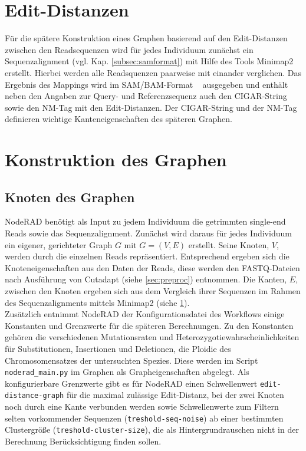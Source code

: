 \section{Edit-Distanzen} \label{sec:edit}

Für die spätere Konstruktion eines Graphen basierend auf den Edit-Distanzen zwischen den Readsequenzen wird für jedes Individuum zunächst ein Sequenzalignment (vgl. Kap. \ref {subsec:samformat}) mit Hilfe des Tools Minimap2 ~\cite{li_2018} erstellt. Hierbei werden alle Readsquenzen paarweise mit einander verglichen. Das Ergebnis des Mappings wird im SAM/BAM-Format ~\cite{li_2009} ausgegeben und enthält neben den Angaben zur Query- und Referenzsequenz auch den CIGAR-String sowie den NM-Tag mit den Edit-Distanzen. Der CIGAR-String und der NM-Tag definieren wichtige Kanteneigenschaften des späteren Graphen. \\

\section{Konstruktion des Graphen} \label{sec:graph}
\subsection{Knoten des Graphen} \label{subsec:nodes}
NodeRAD benötigt als Input zu jedem Individuum die getrimmten single-end Reads sowie das Sequenzalignment. Zunächst wird daraus für jedes Individuum ein eigener, gerichteter Graph $ G $ mit $ G = (V,E) $ erstellt. Seine Knoten, $ V $, werden durch die einzelnen Reads repräsentiert. Entsprechend ergeben sich die Knoteneigenschaften aus den Daten der Reads, diese werden den FASTQ-Dateien nach Ausführung von Cutadapt (siehe \ref{sec:preproc}) entnommen. Die Kanten, $ E $, zwischen den Knoten ergeben sich aus dem Vergleich ihrer Sequenzen im Rahmen des Sequenzalignments mittels Minimap2 (siehe \ref{sec:edit}).\\

Zusätzlich entnimmt NodeRAD der Konfigurationsdatei des Workflows einige Konstanten und Grenzwerte für die späteren Berechnungen. Zu den Konstanten gehören die verschiedenen Mutationsraten und Heterozygotiewahrscheinlichkeiten für Substitutionen, Insertionen und Deletionen, die Ploidie des Chromosomensatzes der untersuchten Spezies. Diese werden im Script \lstinline|noderad_main.py| im Graphen als Grapheigenschaften abgelegt. Als konfigurierbare Grenzwerte gibt es für NodeRAD einen Schwellenwert \lstinline|edit-distance-graph| für die maximal zulässige Edit-Distanz, bei der zwei Knoten noch durch eine Kante verbunden werden sowie Schwellenwerte zum Filtern selten vorkommender Sequenzen \linebreak (\lstinline|treshold-seq-noise|) ab einer bestimmten Clustergröße (\lstinline|treshold-cluster-size|), die als Hintergrundrauschen nicht in der Berechnung Berücksichtigung finden sollen. \\

